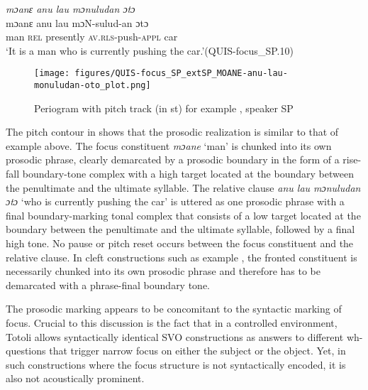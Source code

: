  

\newpage
\ea
\label{ex:Moane anu focus}
\textit{mɔanɛ anu lau mɔnuludan ɔtɔ} \\
\gll   mɔanɛ anu lau mɔN-sulud-an ɔtɔ\\
man \textsc{rel} presently \textsc{av.rls-}push\textsc{-appl} car\\
\glt `It is a man who is currently pushing the car.'\hfil(QUIS-focus\_SP.10)
\z


\begin{figure}
	\texttt{[image: figures/QUIS-focus\_SP\_extSP\_MOANE-anu-lau-monuludan-oto\_plot.png]}
	\caption{Periogram with pitch track (in st) for example , speaker SP}
	\label{Moane anu focus}
\end{figure}

The pitch contour in   shows that the prosodic realization is similar to that of example  above. The focus constituent \textit{mɔane} `man' is chunked into its own prosodic phrase, clearly demarcated by a prosodic boundary in the form of a rise-fall boundary-tone complex with a high target located  at the boundary between the penultimate and the ultimate syllable. The relative clause \textit{anu lau mɔnuludan ɔtɔ} `who is currently pushing the car'  is uttered as one prosodic phrase with a final boundary-marking tonal complex that consists of a low target  located at the boundary between the penultimate and the ultimate syllable, followed by a final high tone. No pause or pitch reset occurs between the focus constituent and the relative clause. In cleft constructions such as example , the fronted constituent is necessarily chunked into its own prosodic phrase and therefore has to be demarcated with a phrase-final boundary tone. 


The prosodic marking appears to be concomitant to the syntactic marking of focus. Crucial to this discussion is the fact that in a controlled environment, Totoli allows syntactically identical SVO constructions as answers to different wh-questions that trigger narrow focus on either the subject or the object. Yet, in such constructions where the focus structure is not syntactically encoded, it is also not acoustically prominent.



